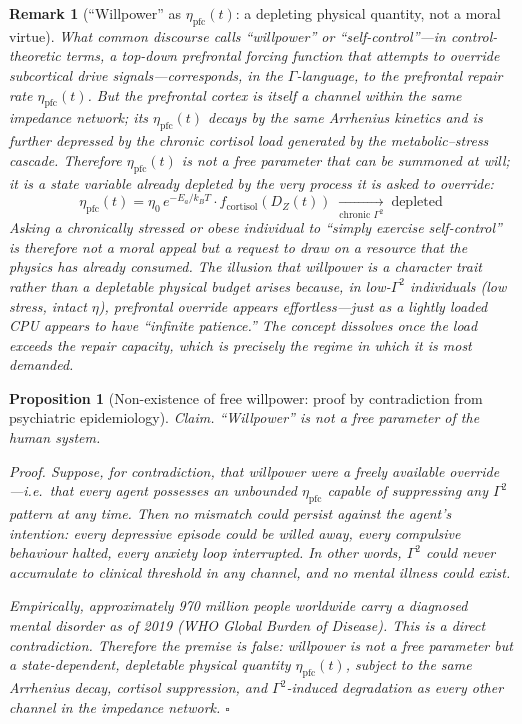 \documentclass[aps,pre,twocolumn,superscriptaddress,floatfix]{revtex4-2}
\newtheorem{proposition}{Proposition}
\newtheorem{remark}{Remark}
\begin{document}
\begin{remark}[``Willpower'' as
$\eta_{\text{pfc}}(t)$: a depleting physical
quantity, not a moral virtue]
\label{rem:willpower}
What common discourse calls ``willpower'' or
``self-control''---in control-theoretic terms,
a \emph{top-down prefrontal forcing function}
that attempts to override subcortical drive
signals---corresponds, in the $\Gamma$-language,
to the prefrontal repair rate $\eta_{\text{pfc}}(t)$.
But the prefrontal cortex is itself a channel
within the same impedance network;
its $\eta_{\text{pfc}}(t)$ decays by the same
Arrhenius kinetics and is further depressed by
the chronic cortisol load generated by the
metabolic--stress cascade.
Therefore $\eta_{\text{pfc}}(t)$ is not a free
parameter that can be summoned at will;
it is a \emph{state variable} already depleted by
the very process it is asked to override:
%
\[
  \eta_{\text{pfc}}(t)
  = \eta_0 \, e^{-E_a/k_B T}
    \cdot f_{\text{cortisol}}(D_Z(t))
  \;\xrightarrow[\text{chronic }\Gamma^2]{}\;
  \text{depleted}
\]
%
Asking a chronically stressed or obese individual
to ``simply exercise self-control'' is therefore
not a moral appeal but a request to draw on
a resource that the physics has already consumed.
The illusion that willpower is a character trait
rather than a depletable physical budget arises
because, in low-$\Gamma^2$ individuals
(low stress, intact $\eta$), prefrontal override
appears effortless---just as a lightly loaded CPU
appears to have ``infinite patience.''
The concept dissolves once the load exceeds the
repair capacity, which is precisely the regime
in which it is most demanded.
\end{remark}

\begin{proposition}[Non-existence of free willpower:
proof by contradiction from psychiatric epidemiology]
\label{prop:no-free-will}
\emph{Claim.}\;
``Willpower'' is not a free parameter of the
human system.

\emph{Proof.}\;
Suppose, for contradiction, that willpower
were a freely available override---i.e.\ that
every agent possesses an unbounded
$\eta_{\text{pfc}}$ capable of suppressing
any $\Gamma^2$ pattern at any time.
Then no mismatch could persist against the agent's
intention:
every depressive episode could be willed away,
every compulsive behaviour halted, every anxiety
loop interrupted.
In other words, $\Gamma^2$ could never
accumulate to clinical threshold in any channel,
and \emph{no mental illness could exist}.

Empirically, approximately 970 million
people worldwide carry a diagnosed mental
disorder as of 2019 (WHO Global Burden of
Disease).
This is a direct contradiction.
Therefore the premise is false:
willpower is not a free parameter but a
state-dependent, depletable physical quantity
$\eta_{\text{pfc}}(t)$, subject to the same
Arrhenius decay, cortisol suppression, and
$\Gamma^2$-induced degradation as every other
channel in the impedance network.
$\square$
\end{proposition}
\end{document}
